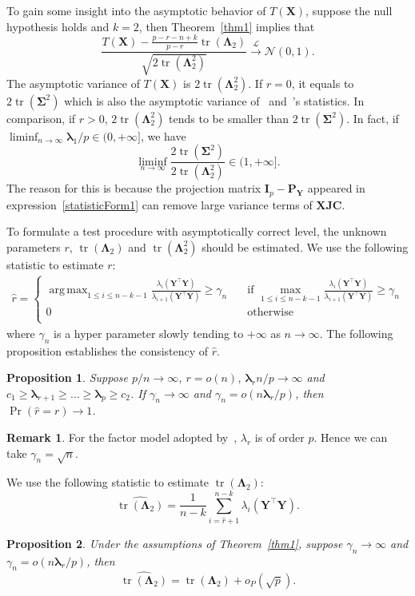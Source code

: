 \documentclass[12pt]{article} %
\DeclareMathOperator{\mytr}{tr}
\DeclareMathOperator*{\argmax}{arg\,max}
\newcommand{\bX}{\mathbf{X}}
\newcommand{\bP}{\mathbf{P}}
\newcommand{\bY}{\mathbf{Y}}
\newcommand{\bJ}{\mathbf{J}}
\newcommand{\bC}{\mathbf{C}}
\newcommand{\bI}{\mathbf{I}}
\newcommand{\bfsym}[1]{\ensuremath{\boldsymbol{#1}}}
\def\blambda {\bfsym {\lambda}}
\def\bLambda {\bfsym {\Lambda}}
\def\bSigma {\bfsym {\Sigma}}
\newtheorem{proposition}{Proposition}
\theoremstyle{definition}
\newtheorem{remark}{Remark}
\begin{document}
To gain some insight into the asymptotic behavior of $T(\bX)$, suppose the null hypothesis holds and $k=2$, then Theorem~\ref{thm1} implies that
$$
\frac{T(\bX)-\frac{p-r-n+k}{p-r}\mytr(\bLambda_2)}{\sqrt{2\mytr (\bLambda_2^2)}}\xrightarrow{\mathcal{L}}\mathcal{N}(0,1).
$$
The asymptotic variance of $T(\bX)$ is ${2\mytr (\bLambda_2^2)}$.
If $r=0$, it equals to ${2\mytr (\bSigma^2)}$ which is also the asymptotic variance of~\citet{Bai1996Efiect} and~\citet{Chen2010A}'s statistics.
In comparison, if $r>0$, ${2\mytr (\bLambda_2^2)}$ tends to be smaller than $2\mytr(\bSigma^2)$.
In fact, if $\liminf_{n\to \infty} \blambda_1/p \in (0,+\infty]$, we have
$$
\liminf_{n\to \infty}\frac{2\mytr(\bSigma^2)}{2\mytr(\bLambda_2^2)}\in (1,+\infty].
$$
The reason for this is because the projection matrix $\bI_p-\bP_{\bY}$ appeared in expression~\eqref{statisticForm1} can remove large variance terms of $\bX\bJ \bC$.

To formulate a test procedure with asymptotically correct level, the unknown parameters $r$, $\mytr(\bLambda_2)$ and $\mytr(\bLambda_2^2)$ should be estimated.
We use the following statistic to estimate $r$:
    $$
    \begin{aligned}
    \hat{r}=
            \begin{cases}
                \argmax_{1\leq i\leq n-k-1} \frac{\lambda_i(\bY^\top \bY)}{\lambda_{i+1}(\bY^\top \bY)}\geq \gamma_n\quad& \text{if } \max_{1\leq i\leq n-k-1}\frac{\lambda_i(\bY^\top \bY)}{\lambda_{i+1}(\bY^\top \bY)}\geq \gamma_n\\
                0\quad&\text{otherwise}\\
            \end{cases}
    \end{aligned}
    $$
where $\gamma_n$ is a hyper parameter slowly tending to $+\infty$ as $n\to \infty$.
The following proposition establishes the consistency of $\hat{r}$.
\begin{proposition}\label{numberConsistency}
    Suppose $p/n\to \infty$, $r=o(n)$, $\blambda_r n/p\to \infty$ and $c_1\geq\blambda_{r+1}\geq \ldots \geq \blambda_p\geq c_2$. If $\gamma_n\to \infty$ and $\gamma_n = o(n\blambda_r/p)$, then
 $\Pr(\hat{r}=r)\to 1$.
\end{proposition}
\begin{remark}
    For the factor model adopted by~\cite{Ma2015A}, $\lambda_r$ is of order $p$. Hence we can take $\gamma_n=\sqrt{n}$.
\end{remark}
    We use the following statistic to estimate $\mytr(\bLambda_2)$:
    $$\widehat{\mytr(\bLambda_2)}=\frac{1}{n-k}\sum_{i=\hat{r}+1}^{n-k}\lambda_i(\bY^\top \bY).$$
\begin{proposition}\label{traceProp1}
    Under the assumptions of Theorem~\ref{thm1}, suppose $\gamma_n\to \infty$ and $\gamma_n=o({n\blambda_r}/{p})$, then
    $$\widehat{\mytr(\bLambda_2)}=\mytr(\bLambda_2)+o_P(\sqrt{p}).$$
\end{proposition}
\end{document}
